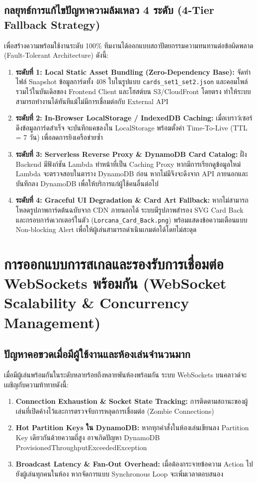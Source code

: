 \documentclass[12pt,a4paper]{report}
\begin{document}
\subsection{กลยุทธ์การแก้ไขปัญหาความล้มเหลว 4 ระดับ (4-Tier Fallback Strategy)}
เพื่อสร้างความพร้อมใช้งานระดับ 100\% ทีมงานได้ออกแบบสถาปัตยกรรมความทนทานต่อข้อผิดพลาด (Fault-Tolerant Architecture) ดังนี้:
\begin{enumerate}
    \item \textbf{ระดับที่ 1: Local Static Asset Bundling (Zero-Dependency Base):} จัดทำไฟล์ Snapshot ข้อมูลการ์ดทั้ง 408 ใบในรูปแบบ \texttt{cards\_set1\_set2.json} และคอมไพล์รวมไว้ในบันเดิลของ Frontend Client และโฮสต์บน S3/CloudFront โดยตรง ทำให้ระบบสามารถทำงานได้ทันทีแม้ไม่มีการเชื่อมต่อกับ External API
    \item \textbf{ระดับที่ 2: In-Browser LocalStorage / IndexedDB Caching:} เมื่อเบราว์เซอร์ดึงข้อมูลการ์ดสำเร็จ จะบันทึกแคชลงใน LocalStorage พร้อมตั้งค่า Time-To-Live (TTL = 7 วัน) เพื่อลดการยิงเครือข่ายซ้ำ
    \item \textbf{ระดับที่ 3: Serverless Reverse Proxy \& DynamoDB Card Catalog:} ฝั่ง Backend มีฟังก์ชัน Lambda ทำหน้าที่เป็น Caching Proxy หากมีการเรียกดูข้อมูลใหม่ Lambda จะตรวจสอบในตาราง DynamoDB ก่อน หากไม่มีจึงจะดึงจาก API ภายนอกและบันทึกลง DynamoDB เพื่อให้บริการแก่ผู้ใช้คนอื่นต่อไป
    \item \textbf{ระดับที่ 4: Graceful UI Degradation \& Card Art Fallback:} หากไม่สามารถโหลดรูปภาพการ์ดต้นฉบับจาก CDN ภายนอกได้ ระบบมีรูปภาพสำรอง SVG Card Back และกรอบการ์ดเวกเตอร์ในตัว (\texttt{Lorcana\_Card\_Back.png}) พร้อมแสดงข้อความเตือนแบบ Non-blocking Alert เพื่อให้ผู้เล่นสามารถดำเนินเกมต่อได้โดยไม่สะดุด
\end{enumerate}

\section{การออกแบบการสเกลและรองรับการเชื่อมต่อ WebSockets พร้อมกัน (WebSocket Scalability \& Concurrency Management)}

\subsection{ปัญหาคอขวดเมื่อมีผู้ใช้งานและห้องเล่นจำนวนมาก}
เมื่อมีผู้เล่นพร้อมกันในระดับหลายร้อยถึงหลายพันห้องพร้อมกัน ระบบ WebSockets บนคลาวด์จะเผชิญกับความท้าทายดังนี้:
\begin{enumerate}
    \item \textbf{Connection Exhaustion \& Socket State Tracking:} การติดตามสถานะของผู้เล่นที่เปิดค้างไว้และการตรวจจับการหลุดการเชื่อมต่อ (Zombie Connections)
    \item \textbf{Hot Partition Keys ใน DynamoDB:} หากทุกคำสั่งในห้องเล่นเขียนลง Partition Key เดียวกันด้วยความถี่สูง อาจเกิดปัญหา DynamoDB ProvisionedThroughputExceededException
    \item \textbf{Broadcast Latency \& Fan-Out Overhead:} เมื่อต้องกระจายข้อความ Action ไปยังผู้เล่นทุกคนในห้อง หากจัดการแบบ Synchronous Loop จะเพิ่มเวลาตอบสนอง
\end{enumerate}
\end{document}
